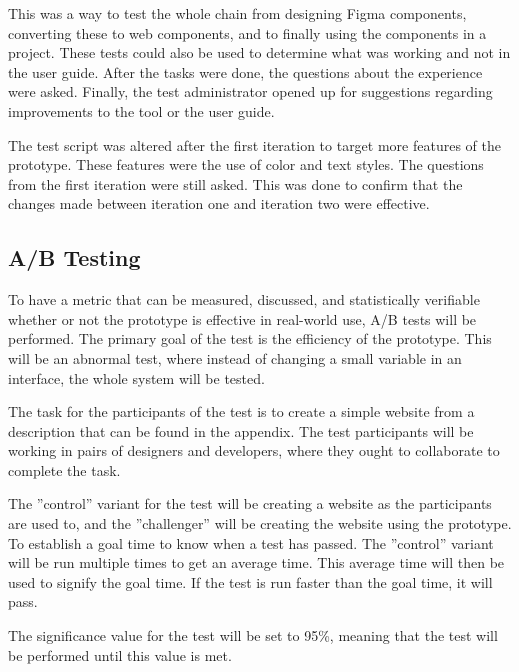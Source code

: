 This was a way to test the whole chain from designing Figma components, converting these to web components, and to finally using the components in a project. These tests could also be used to determine what was working and not in the user guide. After the tasks were done, the questions about the experience were asked. Finally, the test administrator opened up for suggestions regarding improvements to the tool or the user guide. 

The test script was altered after the first iteration to target more features of the prototype. These features were the use of color and text styles. The questions from the first iteration were still asked. This was done to confirm that the changes made between iteration one and iteration two were effective. 







\subsection{ A/B Testing }%
\label{sub:ab-testing}
To have a metric that can be measured, discussed, and statistically verifiable whether or not the prototype is effective in real-world use, A/B tests will be performed.  The primary goal of the test is the efficiency of the prototype. This will be an abnormal test, where instead of changing a small variable in an interface, the whole system will be tested. 

The task for the participants of the test is to create a simple website from a description that can be found in the appendix. The test participants will be working in pairs of designers and developers, where they ought to collaborate to complete the task. 

The ''control'' variant for the test will be creating a website as the participants are used to, and the ''challenger'' will be creating the website using the prototype. To establish a goal time to know when a test has passed. The ''control'' variant will be run multiple times to get an average time. This average time will then be used to signify the goal time. If the test is run faster than the goal time, it will pass. 

The significance value for the test will be set to 95\%, meaning that the test will be performed until this value is met. 


